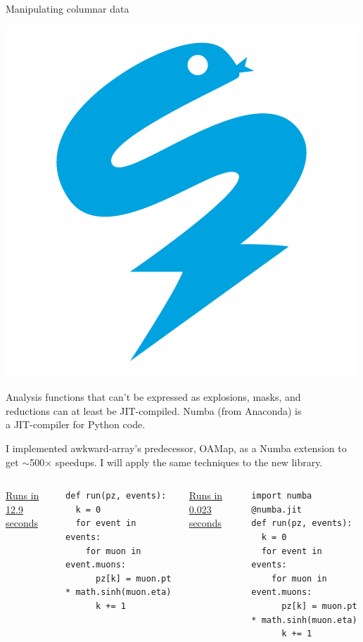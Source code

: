 \documentclass[aspectratio=169]{beamer}
\begin{document}
\begin{frame}[fragile]{Manipulating columnar data}
\vspace{0.5 cm}

\hfill \includegraphics[height=2 cm]{numba-logo.png}

\vspace{-2 cm}

Analysis functions that can't be expressed as explosions, masks, and \\
reductions can at least be JIT-compiled. Numba (from Anaconda) is \\
a JIT-compiler for Python code.

\vspace{0.5 cm}
I implemented awkward-array's predecessor, OAMap, as a Numba extension to get $\sim$500$\times$ speedups. I will apply the same techniques to the new library.

\vspace{0.5 cm}
\begin{columns}[t]
\underline{Runs in 12.9 seconds}

\scriptsize
\vspace{2\baselineskip}
\begin{verbatim}
def run(pz, events):
  k = 0
  for event in events:
    for muon in event.muons:
      pz[k] = muon.pt * math.sinh(muon.eta)
      k += 1
\end{verbatim}

\underline{Runs in 0.023 seconds}

\scriptsize
\begin{verbatim}
import numba
@numba.jit
def run(pz, events):
  k = 0
  for event in events:
    for muon in event.muons:
      pz[k] = muon.pt * math.sinh(muon.eta)
      k += 1
\end{verbatim}
\end{columns}
\end{frame}
\end{document}
